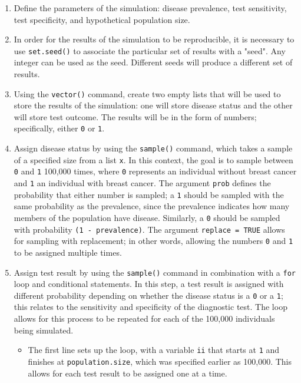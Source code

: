 \begin{enumerate}
  \item Define the parameters of the simulation: disease prevalence, test sensitivity, test specificity, and hypothetical population size.
  
  \item In order for the results of the simulation to be reproducible, it is necessary to use \texttt{set.seed()} to associate the particular set of results with a "seed". Any integer can be used as the seed. Different seeds will produce a different set of results. 
  
  \item Using the \texttt{vector()} command, create two empty lists that will be used to store the results of the simulation: one will store disease status and the other will store test outcome. The results will be in the form of numbers; specifically, either \texttt{0} or \texttt{1}. 
  
  \item Assign disease status by using the \texttt{sample()} command, which takes a sample of a specified size from a list \texttt{x}. In this context, the goal is to sample between \texttt{0} and \texttt{1} 100,000 times, where \texttt{0} represents an individual without breast cancer and \texttt{1} an individual with breast cancer. The argument \texttt{prob} defines the probability that either number is sampled; a \texttt{1} should be sampled with the same probability as the prevalence, since the prevalence indicates how many members of the population have disease. Similarly, a \texttt{0} should be sampled with probability \texttt{(1 - prevalence)}. The argument \texttt{replace = TRUE} allows for sampling with replacement; in other words, allowing the numbers \texttt{0} and \texttt{1} to be assigned multiple times. 
  
  \item Assign test result by using the \texttt{sample()} command in combination with a \texttt{for} loop and conditional statements. In this step, a test result is assigned with different probability depending on whether the disease status is a \texttt{0} or a \texttt{1}; this relates to the sensitivity and specificity of the diagnostic test. The loop allows for this process to be repeated for each of the 100,000 individuals being simulated.
  
  \begin{itemize}
    \item The first line sets up the loop, with a variable \texttt{ii} that starts at \texttt{1} and finishes at \texttt{population.size}, which was specified earlier as 100,000. This allows for each test result to be assigned one at a time.
    

\end{itemize}
\end{enumerate}
